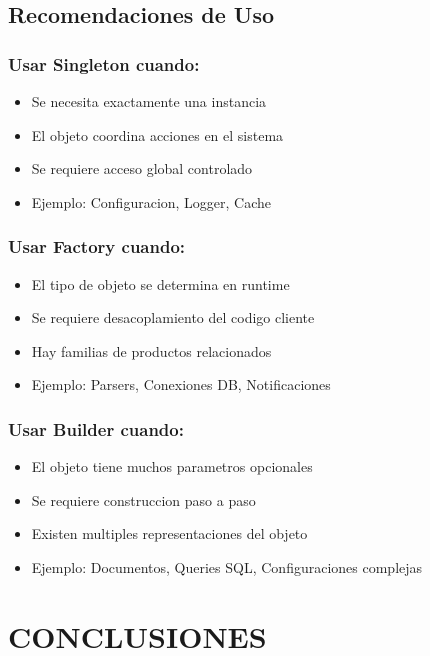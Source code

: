 \documentclass[11pt,a4paper]{article}
\begin{document}
\subsection{Recomendaciones de Uso}

\subsubsection{Usar Singleton cuando:}
\begin{itemize}
    \item Se necesita exactamente una instancia
    \item El objeto coordina acciones en el sistema
    \item Se requiere acceso global controlado
    \item Ejemplo: Configuracion, Logger, Cache
\end{itemize}

\subsubsection{Usar Factory cuando:}
\begin{itemize}
    \item El tipo de objeto se determina en runtime
    \item Se requiere desacoplamiento del codigo cliente
    \item Hay familias de productos relacionados
    \item Ejemplo: Parsers, Conexiones DB, Notificaciones
\end{itemize}

\subsubsection{Usar Builder cuando:}
\begin{itemize}
    \item El objeto tiene muchos parametros opcionales
    \item Se requiere construccion paso a paso
    \item Existen multiples representaciones del objeto
    \item Ejemplo: Documentos, Queries SQL, Configuraciones complejas
\end{itemize}

\section{CONCLUSIONES}
\end{document}
